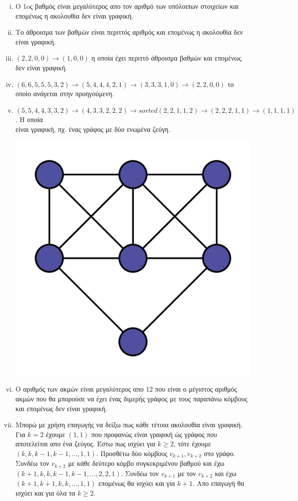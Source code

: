 \begin{enumerate}[i.]

\item Ο 1oς βαθμός είναι μεγαλύτερος απο τον αριθμό των υπόλοιπων στοιχείων και επομένως η ακολουθία δεν είναι γραφική.
\item Το άθροισμα των βαθμών είναι περιττός αριθμός και επομένως η ακολουθία δεν είναι γραφική.
\item $(2,2,0,0) \rightarrow (1,0,0)$ η οποία έχει περιττό άθροισμα βαθμών και επομένως δεν είναι γραφική.
\item $(6,6,5,5,5,3,2) \rightarrow (5,4,4,4,2,1) \rightarrow (3,3,3,1,0) \rightarrow (2,2,0,0)$ το οποίο ανάγεται στην προηγούμενη.
\item $(5,5,4,4,3,3,2) \rightarrow (4,3,3,2,2,2) \rightarrow sorted(2,2,1,1,2) \rightarrow (2,2,2,1,1) \rightarrow (1,1,1,1)$. Η οποία \\
      είναι γραφική, πχ. ένας γράφος με δύο ενωμένα ζεύγη. 

        \begin{center} \includegraphics[width=.3\textwidth]{./exercise2/diagrams/d1.png} \end{center}
\item Ο αριθμός των ακμών είναι μεγαλύτερος απο 12 που είναι ο μέγιστος αριθμός ακμών που θα μπορούσε να έχει ένας διμερής γράφος με τους παραπάνω κόμβους και επομένως
      δεν είναι γραφική.
\item Μπορώ με χρήση επαγωγής να δείξω πως κάθε τέτοια ακολουθία είναι γραφική. Για $k=2$ έχουμε $(1,1)$ που προφανώς είναι γραφική ώς γράφος που αποτελείται
απο ένα ζεύγος. Έστω πως ισχύει για $k \ge 2$, τότε έχουμε $(k,k,k-1,k-1,...,1,1)$. Προσθέτω δύο κόμβους $v_{k+1}, v_{k+2}$ στο γράφο. Συνδέω τον
        $v_{k+2}$ με κάθε δεύτερο κόμβο συγκεκριμένου βαθμού και έχω $(k+1,k,k,k-1,k-1,...,2,2,1)$. Συνδέω τον $v_{k+1}$ με τον $v_{k+2}$ και έχω
        $(k+1,k+1,k,k,...,1,1)$ επομένως θα ισχύει και για $k+1$. Απο επαγωγή θα ισχύει και για όλα τα $k \ge 2$.

    
\end{enumerate}


